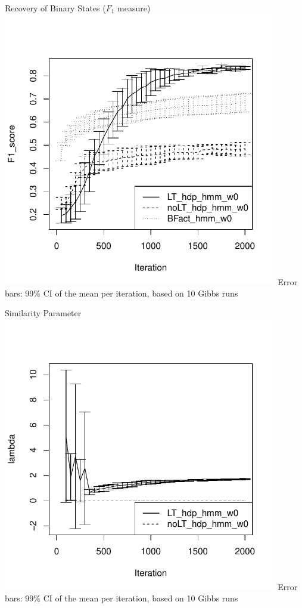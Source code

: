 \documentclass[11pt, mathserif, handout, table]{beamer}
\begin{document}
\begin{frame}{Recovery of Binary States ($F_1$ measure)}
\vspace{-0.4in}
    \includegraphics[width=0.9\textwidth]{img/cocktail/F1_score.pdf}
    Error bars: 99\% CI of the mean per iteration, based on 10 Gibbs runs
\end{frame}
\begin{frame}{Similarity Parameter}
\vspace{-0.4in}
    \includegraphics[width=0.9\textwidth]{img/cocktail/lambda.pdf}
    Error bars: 99\% CI of the mean per iteration, based on 10 Gibbs runs
\end{frame}
\end{document}
